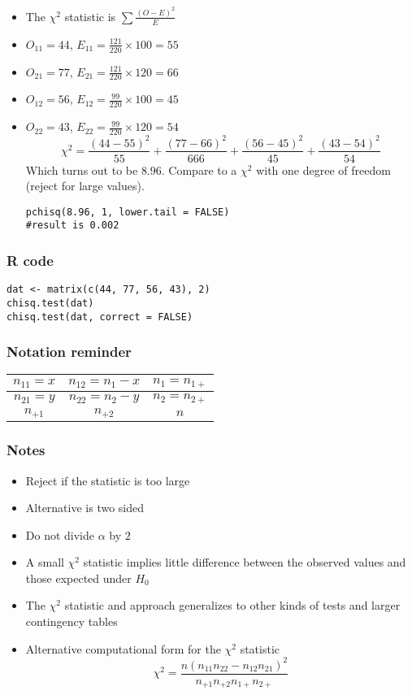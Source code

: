 \documentclass[aspectratio=169]{beamer}
\begin{document}
\begin{frame}[fragile]
\begin{itemize}
\item The $\chi^2$ statistic is $\sum \frac{(O - E)^2}{E}$
\item $O_{11} = 44$, $E_{11} = \frac{121}{220}\times 100 = 55$
\item $O_{21} = 77$, $E_{21} = \frac{121}{220}\times 120 = 66$
\item $O_{12} = 56$, $E_{12} = \frac{99}{220}\times 100 = 45$
\item $O_{22} = 43$, $E_{22} = \frac{99}{220}\times 120 = 54$
$$
\chi^2  = \frac{(44 - 55)^2}{55} + \frac{(77 - 66)^2}{666} 
         + \frac{(56 - 45)^2}{45} + \frac{(43 - 54)^2}{54} 
$$
Which turns out to be $8.96$. Compare to a $\chi^2$ with one degree of
freedom (reject for large values).
\begin{verbatim}
pchisq(8.96, 1, lower.tail = FALSE) 
#result is 0.002
\end{verbatim}
\end{itemize}
\end{frame}

\begin{frame}[fragile]\frametitle{R code}
\begin{verbatim}
dat <- matrix(c(44, 77, 56, 43), 2)
chisq.test(dat)
chisq.test(dat, correct = FALSE)
\end{verbatim}  
\end{frame}

\begin{frame}\frametitle{Notation reminder}
\begin{center}
\begin{tabular}{|c|c|c|}\hline
$n_{11} = x$ & $n_{12} = n_1 - x$ & $n_1 = n_{1+}$ \\ \hline
$n_{21} = y$ & $n_{22} = n_2 - y$ & $n_2 = n_{2+}$ \\ \hline
$n_{+1}$     & $n_{+2}$           &   $n$    \\ \hline 
\end{tabular}
\end{center}
\end{frame}

\begin{frame}\frametitle{Notes}
\begin{itemize}
\item Reject if the statistic is too large
\item Alternative is two sided
\item Do not divide $\alpha$ by $2$
\item A small $\chi^2$ statistic implies little difference between the
  observed values and those expected under $H_0$
\item The $\chi^2$ statistic and approach generalizes to other kinds of
  tests and larger contingency tables
\item Alternative computational form for the $\chi^2$ statistic
$$
\chi^2 = \frac{n(n_{11} n_{22} - n_{12}n_{21})^2}{n_{+1} n_{+2} n_{1+} n_{2+}}
$$
\end{itemize}
\end{frame} 
\end{document}
